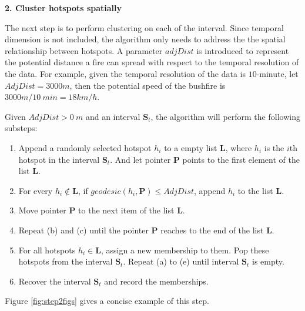 \textbf{2. Cluster hotspots spatially}

The next step is to perform clustering on each of the interval. Since
temporal dimension is not included, the algorithm only needs to address
the the spatial relationship between hotspots. A parameter \(adjDist\)
is introduced to represent the potential distance a fire can spread with
respect to the temporal resolution of the data. For example, given the
temporal resolution of the data is \(10\)-minute, let
\(AdjDist = 3000 m\), then the potential speed of the bushfire is
\(3000m/10~min = 18km/h\).

Given \(AdjDist>0~m\) and an interval \(\boldsymbol{S}_t\), the
algorithm will perform the following substeps:

\begin{enumerate}
\def\labelenumi{(\alph{enumi})}
\item
  Append a randomly selected hotspot \(h_i\) to a empty list
  \(\boldsymbol{L}\), where \(h_i\) is the \(i\)th hotspot in the
  interval \(\boldsymbol{S}_t\). And let pointer \(\boldsymbol{P}\)
  points to the first element of the list \(\boldsymbol{L}\).
\item
  For every \(h_i \notin \boldsymbol{L}\), if
  \(geodesic(h_i, \boldsymbol{P})\leq AdjDist\), append \(h_i\) to the
  list \(\boldsymbol{L}\).
\item
  Move pointer \(\boldsymbol{P}\) to the next item of the list
  \(\boldsymbol{L}\).
\item
  Repeat (b) and (c) until the pointer \(\boldsymbol{P}\) reaches to the
  end of the list \(\boldsymbol{L}\).
\item
  For all hotspots \(h_i \in \boldsymbol{L}\), assign a new membership
  to them. Pop these hotspots from the interval \(\boldsymbol{S}_t\).
  Repeat (a) to (e) until interval \(\boldsymbol{S}_t\) is empty.
\item
  Recover the interval \(\boldsymbol{S}_t\) and record the memberships.
\end{enumerate}

Figure \ref{fig:step2figs} gives a concise example of this step.


